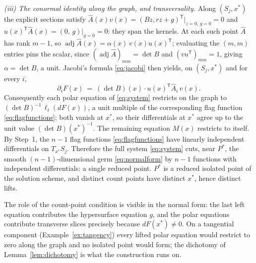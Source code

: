 \documentclass[acmsmall,screen,nonacm]{acmart}
\theoremstyle{definition}
\theoremstyle{remark}
\DeclareMathOperator{\adj}{adj}
\begin{document}
\emph{(iii) The conormal identity along the graph, and
transversality.}  Along $(S_j,x^*)$ the explicit sections satisfy
$\widehat A(x)v(x)=(Bz,rz+g)^{\mathsf T}\big|_{z=0,\,g=0}=0$ and
$u(x)^{\mathsf T}\widehat A(x)=(0,\,g)\big|_{g=0}=0$: they span the
kernels.  At each such point $\widehat A$ has rank $m-1$, so
$\adj\widehat A(x)=\alpha(x)\,v(x)u(x)^{\mathsf T}$; evaluating the
$(m,m)$ entries pins the scalar, since
$(\adj\widehat A)_{mm}=\det B$ and $(vu^{\mathsf T})_{mm}=1$, giving
$\alpha=\det B$, a unit.  Jacobi's formula \eqref{eq:jacobi} then
yields, on $(S_j,x^*)$ and for every $i$,
\[
  \partial_iF(x)\ =\ (\det B)(x)\cdot
  u(x)^{\mathsf T}\widehat A_i\,v(x).
\]
Consequently each polar equation of \eqref{eq:system} restricts on the
graph to $(\det B)^{-1}\,\ell_t(dF(x))$, a unit multiple of the
corresponding flag function \eqref{eq:flagfunctions}; both vanish at
$x^*$, so their differentials at $x^*$ agree up to the unit value
$(\det B)(x^*)^{-1}$.  The remaining equation $M(x)$ restricts to
itself.  By Step~1, the $n-1$ flag functions
\eqref{eq:flagfunctions} have linearly independent differentials on
$T_{x^*}S_j$.  Therefore the full system \eqref{eq:system} cuts, near
$P^*$, the smooth $(n-1)$-dimensional germ \eqref{eq:normalform} by
$n-1$ functions with independent differentials: a single reduced
point.  $P^*$ is a reduced isolated point of the solution scheme, and
distinct count points have distinct $x^*$, hence distinct lifts.

The role of the count-point condition is visible in the normal form:
the last left equation contributes the hypersurface equation $g$, and
the polar equations contribute transverse slices precisely because
$dF(x^*)\ne0$.  On a tangential component (Example~\ref{ex:tangency})
every lifted polar equation would restrict to zero along the graph and
no isolated point would form; the dichotomy of
Lemma~\ref{lem:dichotomy} is what the construction runs on.
\end{document}
